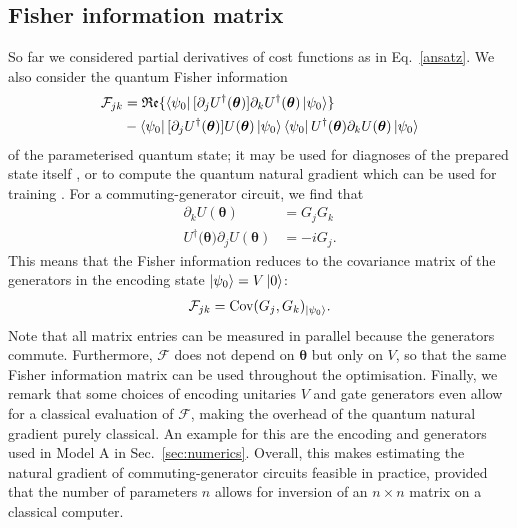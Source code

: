\documentclass[twocolumn]{revtex4-2}
\renewcommand{\vec}{\boldsymbol}
\begin{document}
\subsection{Fisher information matrix}
So far we considered partial derivatives of cost functions as in Eq.~\eqref{ansatz}.
We also consider the quantum Fisher information 
%
\begin{align}
    \mathcal{F}_{jk} &= \mathfrak{Re}\{
    \bra{\psi_0}[\partial_j U^\dagger(\vec\theta)] \partial_k U^\dagger(\vec\theta) \ket{\psi_0}
    \} \\
    &- \bra{\psi_0}[\partial_jU^\dagger(\vec{\theta})] U(\vec{\theta})\ket{\psi_0}
    \bra{\psi_0}U^\dagger(\vec{\theta}) \partial_k U(\vec{\theta})\ket{\psi_0}\nonumber
\end{align}
%
of the parameterised quantum state;
it may be used for diagnoses of the prepared state itself \cite{Meyer2021fisherinformation,Toth_2014,fisher_info_universality}, or to compute the quantum natural gradient which can be used for training \cite{Stokes2020quantumnatural}.
For a commuting-generator circuit, we find that
%
\begin{align}
    [\partial_j U^\dagger(\vec{\theta)}]\partial_k U(\vec\theta) &= G_jG_k\\
    U^\dagger(\vec{\theta)} \partial_j U(\vec\theta) &= -i G_j.
\end{align}
%
This means that the Fisher information reduces to the covariance matrix of the generators in the encoding state $\ket{\psi_0}=V\ket{0}$:
%
\begin{align}
    \mathcal{F}_{jk} = \text{Cov}(G_j, G_k)_{\ket{\psi_0}}.
\end{align}
%
Note that all matrix entries can be measured in parallel because the generators commute. Furthermore, $\mathcal{F}$ does not depend on $\vec{\theta}$ but only on $V$, so that the same Fisher information matrix can be used throughout the optimisation.
Finally, we remark that some choices of encoding unitaries $V$ and gate generators even allow for a classical evaluation of $\mathcal{F}$, making the overhead of the quantum natural gradient purely classical. An example for this are the encoding and generators used in Model A in Sec.\ \ref{sec:numerics}.
Overall, this makes estimating the natural gradient of commuting-generator circuits feasible in practice, provided that the number of parameters $n$ allows for inversion of an $n \times n$ matrix on a classical computer.
\end{document}
